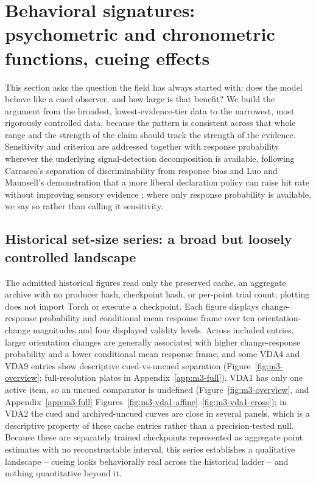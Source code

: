 \documentclass[11pt,a4paper]{article}
\begin{document}
\section{Behavioral signatures: psychometric and chronometric functions, cueing effects}\label{sec:behavior}
This section asks the question the field has always started with: does the model behave like a cued observer, and how large is that benefit? We build the argument from the broadest, lowest-evidence-tier data to the narrowest, most rigorously controlled data, because the pattern is consistent across that whole range and the strength of the claim should track the strength of the evidence. Sensitivity and criterion are addressed together with response probability wherever the underlying signal-detection decomposition is available, following Carrasco's separation of discriminability from response bias and Luo and Maunsell's demonstration that a more liberal declaration policy can raise hit rate without improving sensory evidence \cite{carrasco2011,luo2018}; where only response probability is available, we say so rather than calling it sensitivity.

\subsection{Historical set-size series: a broad but loosely controlled landscape}\label{sec:historical-behavior}
The admitted historical figures read only the preserved  cache, an aggregate archive with no producer hash, checkpoint hash, or per-point trial count; plotting does not import Torch or execute a checkpoint. Each figure displays change-response probability and conditional mean response frame over ten orientation-change magnitudes and four displayed validity levels. Across included entries, larger orientation changes are generally associated with higher change-response probability and a lower conditional mean response frame, and some VDA4 and VDA9 entries show descriptive cued-vs-uncued separation (Figure~\ref{fig:m3-overview}; full-resolution plates in Appendix~\ref{app:m3-full}). VDA1 has only one active item, so an uncued comparator is undefined (Figure~\ref{fig:m3-overview}, and Appendix~\ref{app:m3-full} Figures~\ref{fig:m3-vda1-affine}--\ref{fig:m3-vda1-cross}); in VDA2 the cued and archived-uncued curves are close in several panels, which is a descriptive property of these cache entries rather than a precision-tested null. Because these are separately trained checkpoints represented as aggregate point estimates with no reconstructable interval, this series establishes a qualitative landscape -- cueing looks behaviorally real across the historical ladder -- and nothing quantitative beyond it.
\end{document}
